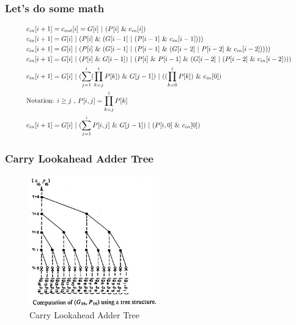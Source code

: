 \begin{frame}
    \frametitle{Let's do some math}
    \begin{equation}
 \resizebox{0.9\textwidth}{!}{%
            $
            \begin{aligned}
                &c_{in}[i+1]=c_{out}[i]=G[i] \ | \  (P[i] \ \& \ c_{in}[i])\\
                &c_{in}[i+1]=G[i] \ | \  (P[i] \ \& \ (G[i-1]  \ | \  (P[i-1] \ \& \ c_{in}[i-1])))\\
                &c_{in}[i+1]=G[i] \ | \  (P[i] \ \& \ (G[i-1]  \ | \  (P[i-1] \ \& \ (G[i-2]  \ | \  P[i-2] \ \& \ c_{in}[i-2]))))\\
                &c_{in}[i+1]=G[i] \ | \  (P[i] \ \& \ G[i-1])  \ | \  (P[i] \ \& \ P[i-1] \ \& \ (G[i-2]  \ | \  (P[i-2] \ \& \ c_{in}[i-2])))\\
                &c_{in}[i+1]=G[i] \ | \  (\sum_{j=1}^{i} (\prod_{k=j}^{i} P[k]) \  \& \ G[j-1]) \ | \  ((\prod_{k=0}^{i} P[k]) \ \& \ c_{in}[0])\\
                &\text{Notation: } i \geq j \text{ , } P[i, j] = \prod_{k=j}^{i} P[k] \\
                &c_{in}[i+1]=G[i] \ | \  (\sum_{j=1}^{i} P[i, j] \  \& \ G[j-1]) \ | \  (P[i, 0] \ \& \ c_{in}[0])\\
            \end{aligned}$%
 }
    \end{equation}
\end{frame}

\begin{frame}
    \frametitle{Carry Lookahead Adder Tree}
    \begin{figure}
        \centering
        \includegraphics[width=0.5\textwidth]{media/cla_tree.jpg}
        \caption{Carry Lookahead Adder Tree}
    \end{figure}
\end{frame}

